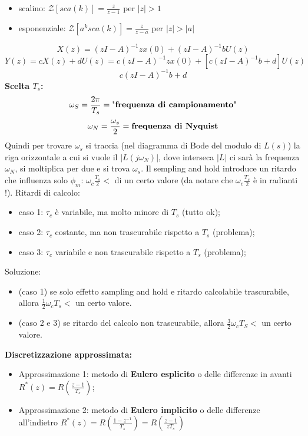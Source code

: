 \begin{landscape}
\begin{multicols*}{3}
\begin{itemize}
    \item scalino: $\mathcal{Z}[sca(k)] = \frac{z}{z-1}$ per $|z|>1$
    \item esponenziale: $\mathcal{Z}[a^k sca(k)] = \frac{z}{z-a}$ per $|z| > |a|$
\end{itemize}
\[
    X(z) = (zI-A)^{-1} z x(0) + (zI-A)^{-1} b U(z)
\]
\[
    Y(z) = cX(z) + dU(z) = c(zI-A)^{-1} z x(0) + [c(zI-A)^{-1} b + d] U(z)
\]
\[
    c(zI-A)^{-1} b + d
\]
\textbf{Scelta $T_s$:}
\[
    \omega_S =\frac{2\pi}{T_s} = \text{"\textbf{frequenza di campionamento}"}
\]
\[
    \omega_N = \frac{\omega_s}{2} = \text{\textbf{frequenza di Nyquist}}
\]
Quindi per trovare $\omega_s$ si traccia (nel diagramma di Bode del modulo di $L(s)$) la riga orizzontale a cui si vuole il $|L(j \omega_N)|$, dove interseca $|L|$ ci sarà la frequenza $\omega_N$, si moltiplica per due e si trova $\omega_s$.\newline
Il sempling and hold introduce un ritardo che influenza solo $\phi_m$: $\omega_c \frac{T_s}{2} < $ di un certo valore (da notare che $\omega_c \frac{T_s}{2}$ è in radianti !).\newline
Ritardi di calcolo:
\begin{itemize}
    \item caso 1: $\tau_c$ è variabile, ma molto minore di $T_s$ (tutto ok);
    \item caso 2: $\tau_c$ costante, ma non trascurabile rispetto a $T_s$ (problema);
    \item caso 3: $\tau_c$ variabile e non trascurabile rispetto a $T_s$ (problema);
\end{itemize}
Soluzione:
\begin{itemize}
    \item (caso 1) se solo effetto sampling and hold e ritardo calcolabile trascurabile, allora $\frac{1}{2} \omega_c T_s <$ un certo valore.
    \item (caso 2 e 3) se ritardo del calcolo non trascurabile, allora $\frac{3}{2} \omega_c T_S <$ un certo valore.
\end{itemize}
\textbf{Discretizzazione approssimata:}
\begin{itemize}
    \item Approssimazione 1: metodo di \textbf{Eulero esplicito} o delle differenze in avanti $R^*(z) = R\left(\frac{z-1}{T_s}\right)$;
    \item Approssimazione 2: metodo di \textbf{Eulero implicito} o delle differenze all'indietro $R^*(z) = R\left(\frac{1-z^{-1}}{T_s}\right) = R\left(\frac{z-1}{z T_s}\right)$
\end{itemize}

\end{multicols*}
\end{landscape}

